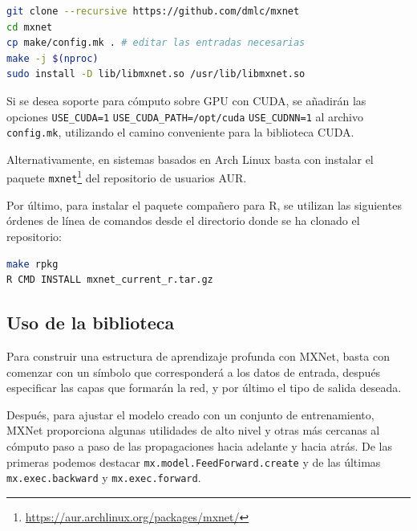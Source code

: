 \begin{lstlisting}[language=sh,frame=none]
git clone --recursive https://github.com/dmlc/mxnet
cd mxnet
cp make/config.mk . # editar las entradas necesarias
make -j $(nproc)
sudo install -D lib/libmxnet.so /usr/lib/libmxnet.so
\end{lstlisting}

Si se desea soporte para cómputo sobre GPU con CUDA, se añadirán las opciones \texttt{USE\_CUDA=1} \texttt{USE\_CUDA\_PATH=/opt/cuda} \texttt{USE\_CUDNN=1} al archivo \texttt{config.mk}, utilizando el camino conveniente para la biblioteca CUDA.

Alternativamente, en sistemas basados en Arch Linux basta con instalar el paquete \texttt{mxnet}\footnote{\url{https://aur.archlinux.org/packages/mxnet/}} del repositorio de usuarios AUR.

Por último, para instalar el paquete compañero para R, se utilizan las siguientes órdenes de línea de comandos desde el directorio donde se ha clonado el repositorio:

\begin{lstlisting}[language=sh,frame=none]
make rpkg
R CMD INSTALL mxnet_current_r.tar.gz
\end{lstlisting}

\subsection{Uso de la biblioteca}
Para construir una estructura de aprendizaje profunda con MXNet, basta con comenzar con un símbolo que corresponderá a los datos de entrada, después especificar las capas que formarán la red, y por último el tipo de salida deseada.

Después, para ajustar el modelo creado con un conjunto de entrenamiento, MXNet proporciona algunas utilidades de alto nivel y otras más cercanas al cómputo paso a paso de las propagaciones hacia adelante y hacia atrás. De las primeras podemos destacar \texttt{mx.model.FeedForward.create} y de las últimas \texttt{mx.exec.backward} y \texttt{mx.exec.forward}.

